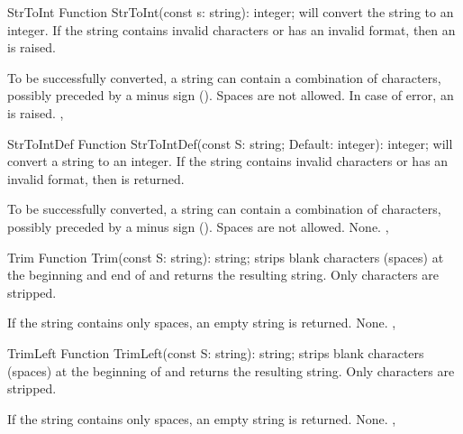 
 
\begin{function}{StrToInt}
\Declaration
Function StrToInt(const s: string): integer;
\Description
{} will convert the string to an integer. 
If the string contains invalid characters or has an invalid format, 
then an  is raised. 

To be successfully converted, a string can contain a combination
of  characters, possibly preceded by a minus sign (\var{-}).
Spaces are not allowed.
\Errors
In case of error, an  is raised.
\SeeAlso
{}, 
\end{function}


 
\begin{function}{StrToIntDef}
\Declaration
Function StrToIntDef(const S: string; Default: integer): integer;
\Description
{} will convert a string to an integer. If the string contains
invalid characters or has an invalid format, then  is returned.

To be successfully converted, a string can contain a combination of 
 characters, possibly preceded by a minus sign (\var{-}).
Spaces are not allowed.
\Errors
None.
\SeeAlso
{}, 
\end{function}


 
\begin{function}{Trim}
\Declaration
Function Trim(const S: string): string;
\Description
{} strips blank characters (spaces) at the beginning and end of 
and returns the resulting string. Only  characters are stripped.

If the string contains only spaces, an empty string is returned.
\Errors
None.
\SeeAlso
{}, 
\end{function}


 
\begin{function}{TrimLeft}
\Declaration
Function TrimLeft(const S: string): string;
\Description
{} strips blank characters (spaces) at the beginning of 
and returns the resulting string. Only  characters are stripped.

If the string contains only spaces, an empty string is returned.
\Errors
None.
\SeeAlso
{}, 
\end{function}

